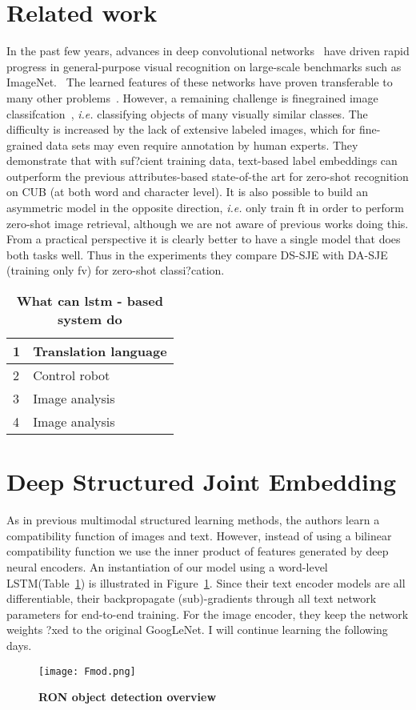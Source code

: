 \documentclass[10pt,twocolumn,letterpaper]{article}
\begin{document}
\section{Related work}
 In the past few years, advances in deep convolutional networks~\cite{name22,name9,name44} have driven rapid progress in general-purpose visual recognition on large-scale benchmarks such as ImageNet.~\cite{name6} The learned features of these networks have proven transferable to many other problems~\cite{name34}. However, a remaining challenge is finegrained image classifcation~\cite{name46,name7,name10,name51}, \emph{i.e.} classifying objects of many visually similar classes. The difficulty is increased by the lack of extensive labeled images, which for fine-grained data sets may even require annotation by human experts. They demonstrate that with suf?cient training data, text-based label embeddings can outperform the previous attributes-based state-of-the art for zero-shot recognition on CUB (at both word and character level). It is also possible to build an asymmetric model in the opposite direction, \emph{i.e.} only train ft in order to perform zero-shot image retrieval, although we are not aware of previous works doing this. From a practical perspective it is clearly better to have a single model that does both tasks well. Thus in the experiments they compare DS-SJE with DA-SJE (training only fv) for zero-shot classi?cation.
  \begin{table}[!htbp]
  \centering
 \begin{tabular}{|p{2cm}|p{2cm}|}
    \hline
    1 & Translation language\\
    \hline
     2 & Control robot\\
    \hline
         3 & Image analysis\\
    \hline
        4 & Image analysis\\
    \hline
  \end{tabular}
  \caption{\textbf{What can lstm - based system do}} \label{Table1}
  \end{table}
\par
\section{Deep Structured Joint Embedding}
As in previous multimodal structured learning methods, the authors learn a compatibility function of images and text. However, instead of using a bilinear compatibility function we use the inner product of features generated by deep neural encoders. An instantiation of our model using a word-level LSTM(Table~\ref{Table1}) is illustrated in Figure~\ref{Figure1}. Since their text encoder models are all differentiable, their backpropagate (sub)-gradients through all text network parameters for end-to-end training. For the image encoder, they keep the network weights ?xed to the original GoogLeNet. I will continue learning the following days.
 \begin{figure}[htbp]
 \centering
 \texttt{[image: Fmod.png]}\\
 \caption{\textbf{RON object detection overview}}\label{Figure1}
\end{figure}


\end{document}
